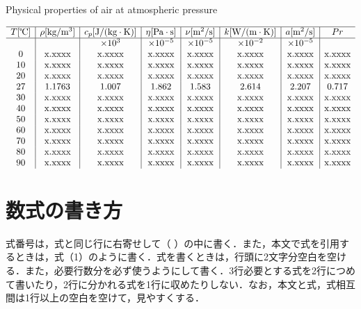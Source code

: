 \documentclass[a4jsme, fleqn]{jsmepaper}
\begin{document}
\begin{table}[t]
\begin{center}
\caption{Physical properties of air at atmospheric pressure}
$\begin{array}{c|c|c|c|c|c|c|c}
\hline
T[\mbox{℃}]&\rho [\mbox{kg}/\mbox{m}^3]&c_p[\mbox{J}/(\mbox{kg}\cdot\mbox{K})]&\eta [\mbox{Pa}\cdot\mbox{s}]&\nu [\mbox{m}^2/\mbox{s}]&k[\mbox{W}/(\mbox{m}\cdot\mbox{K})]&a[\mbox{m}^2/\mbox{s}]&Pr\\
\hline
&&\times 10^3&\times 10^{-5}&\times 10^{-5}&\times 10^{-2}&\times 10^{-5}&\\
0&\mbox{x.xxxx}&\mbox{x.xxxx}&\mbox{x.xxxx}&\mbox{x.xxxx}&\mbox{x.xxxx}&\mbox{x.xxxx}&\mbox{x.xxxx}\\
10&\mbox{x.xxxx}&\mbox{x.xxxx}&\mbox{x.xxxx}&\mbox{x.xxxx}&\mbox{x.xxxx}&\mbox{x.xxxx}&\mbox{x.xxxx}\\
20&\mbox{x.xxxx}&\mbox{x.xxxx}&\mbox{x.xxxx}&\mbox{x.xxxx}&\mbox{x.xxxx}&\mbox{x.xxxx}&\mbox{x.xxxx}\\
27&1.1763&1.007&1.862&1.583&2.614&2.207&0.717\\
30&\mbox{x.xxxx}&\mbox{x.xxxx}&\mbox{x.xxxx}&\mbox{x.xxxx}&\mbox{x.xxxx}&\mbox{x.xxxx}&\mbox{x.xxxx}\\
40&\mbox{x.xxxx}&\mbox{x.xxxx}&\mbox{x.xxxx}&\mbox{x.xxxx}&\mbox{x.xxxx}&\mbox{x.xxxx}&\mbox{x.xxxx}\\
50&\mbox{x.xxxx}&\mbox{x.xxxx}&\mbox{x.xxxx}&\mbox{x.xxxx}&\mbox{x.xxxx}&\mbox{x.xxxx}&\mbox{x.xxxx}\\
60&\mbox{x.xxxx}&\mbox{x.xxxx}&\mbox{x.xxxx}&\mbox{x.xxxx}&\mbox{x.xxxx}&\mbox{x.xxxx}&\mbox{x.xxxx}\\
70&\mbox{x.xxxx}&\mbox{x.xxxx}&\mbox{x.xxxx}&\mbox{x.xxxx}&\mbox{x.xxxx}&\mbox{x.xxxx}&\mbox{x.xxxx}\\
80&\mbox{x.xxxx}&\mbox{x.xxxx}&\mbox{x.xxxx}&\mbox{x.xxxx}&\mbox{x.xxxx}&\mbox{x.xxxx}&\mbox{x.xxxx}\\
90&\mbox{x.xxxx}&\mbox{x.xxxx}&\mbox{x.xxxx}&\mbox{x.xxxx}&\mbox{x.xxxx}&\mbox{x.xxxx}&\mbox{x.xxxx}
\end{array}$
\end{center}
\end{table}

\newpage
\section{数式の書き方}

式番号は，式と同じ行に右寄せして（ ）の中に書く．また，本文で式を引用するときは，式（1）のように書く．式を書くときは，行頭に2文字分空白を空ける．また，必要行数分を必ず使うようにして書く．3行必要とする式を2行につめて書いたり，2行に分かれる式を1行に収めたりしない．なお，本文と式，式相互間は1行以上の空白を空けて，見やすくする．
\end{document}
